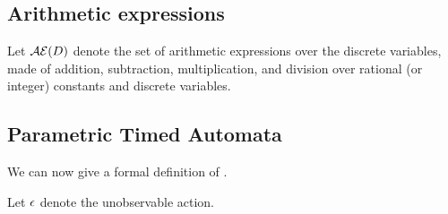 \subsection{Arithmetic expressions}

Let $\mathcal{AE}(D)$ denote the set of arithmetic expressions over the discrete variables, \ie{} made of addition, subtraction, multiplication, and division over rational (or integer) constants and discrete variables.



\subsection{\imitator{} Parametric Timed Automata}


We can now give a formal definition of \IPTA{}.

Let $\epsilon$ denote the unobservable action.

